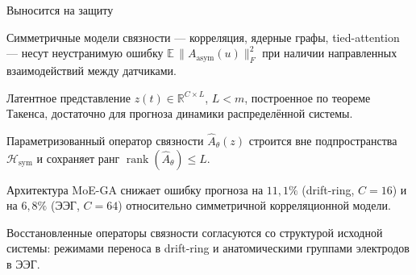 \documentclass[10pt]{beamer}
\DeclareMathOperator{\rank}{rank}
\newcommand{\R}{\mathbb{R}}
\newcommand{\E}{\mathbb{E}}
\newcommand{\Hsym}{\mathcal{H}_{\mathrm{sym}}}
\begin{document}
\begin{frame}{Выносится на защиту}
\footnotesize
\raggedright

Симметричные модели связности --- корреляция, ядерные графы,
tied-attention --- несут неустранимую ошибку $\E\,\|A_{\mathrm{asym}}(u)\|_F^2$
при наличии направленных взаимодействий между датчиками.

\bigskip
Латентное представление $z(t)\in\R^{C\times L}$, $L<m$, построенное по
теореме Такенса, достаточно для прогноза динамики распределённой системы.

\bigskip
Параметризованный оператор связности $\hat A_\theta(z)$ строится вне
подпространства $\Hsym$ и сохраняет ранг $\rank(\hat A_\theta) \le L$.

\bigskip
Архитектура MoE-GA снижает ошибку прогноза на $11{,}1\%$ (drift-ring,
$C=16$) и на $6{,}8\%$ (ЭЭГ, $C=64$) относительно симметричной
корреляционной модели.

\bigskip
Восстановленные операторы связности согласуются со структурой исходной
системы: режимами переноса в drift-ring и анатомическими группами
электродов в ЭЭГ.
\end{frame}
\end{document}
